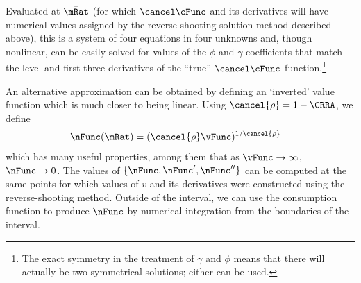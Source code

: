\documentclass{\handout}
\begin{document}
Evaluated at $\bar{\mRat}$ (for which $\psavFunc$ and its derivatives will have numerical values
assigned by the reverse-shooting solution method described above), this is a system of four equations in four unknowns and, though nonlinear, can be easily solved for 
values of the $\phi$ and $\gamma$ coefficients that match the level and first three derivatives
of the ``true'' $\psavFunc$ function.\footnote{The exact symmetry in
  the treatment of $\gamma$ and $\phi$ means that there will actually
  be two symmetrical solutions; either can be used.}

\begin{CDCPrivate} %
\newcommand{\crho}{\cancel{\rho}}
An alternative approximation can be obtained by defining an `inverted' value function which is 
much closer to being linear.   Using $\cancel{\rho}=1-\CRRA$, we define 
\begin{equation}\begin{gathered}\begin{aligned}
  \nFunc(\mRat) & =  (\crho \vFunc)^{1/\crho}
\end{aligned}\end{gathered}\end{equation}
which has many useful properties, among them that as $\vFunc \rightarrow \infty$, $\nFunc \rightarrow 0$.
The values of $\{\nFunc,\nFunc^{\prime},\nFunc^{\prime\prime}\}$ can be computed at the same points for 
which values of $v$ and its derivatives were constructed using the reverse-shooting method.  Outside of the interval, we can use
the consumption function to produce $\nFunc$ by numerical integration from the boundaries of the interval.

\newcommand{\nFuncP}{\nFunc^{\prime}}
\newcommand{\nFuncPP}{\nFunc^{\prime\prime}}
\newcommand{\nFuncPPP}{\nFunc^{\prime\prime\prime}}


\end{CDCPrivate}
\end{document}
